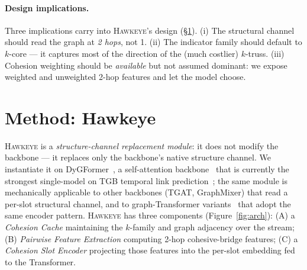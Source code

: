 \documentclass[sigconf,nonacm,review]{acmart}
\newcommand{\method}{\textsc{Hawkeye}\xspace}
\begin{document}
\paragraph{Design implications.}
Three implications carry into \method's design (\S\ref{sec:method}). (i) The
structural channel should read the graph at \emph{2 hops}, not 1. (ii) The
indicator family should default to $k$-core --- it captures most of the
direction of the (much costlier) $k$-truss. (iii) Cohesion weighting should be
\emph{available} but not assumed dominant: we expose weighted and unweighted
2-hop features and let the model choose.

\section{Method: Hawkeye}
\label{sec:method}

\method is a \emph{structure-channel replacement module}: it does not modify
the backbone --- it replaces only the backbone's native structure channel.
We instantiate it on DyGFormer~\cite{yu2023dygformer}, a self-attention
backbone~\cite{vaswani2017attention} that is currently the strongest
single-model on TGB temporal link prediction~\cite{huang2023tgb}; the same
module is mechanically applicable to other backbones (TGAT, GraphMixer)
that read a per-slot structural channel, and to graph-Transformer
variants~\cite{ying2021graphormer} that adopt the same encoder pattern.
\method has three components (Figure~\ref{fig:arch}):
(A) a \emph{Cohesion Cache} maintaining the $k$-family and graph adjacency over
the stream; (B) \emph{Pairwise Feature Extraction} computing 2-hop
cohesive-bridge features; (C) a \emph{Cohesion Slot Encoder} projecting those
features into the per-slot embedding fed to the Transformer.
\end{document}
